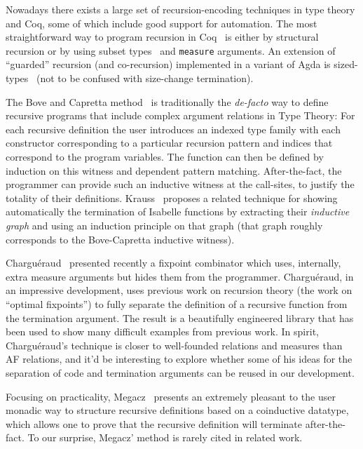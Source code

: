 \documentclass{llncs}
\begin{document}
Nowadays there exists a large set of recursion-encoding techniques in 
type theory and Coq, some of which include good support for automation.
The most straightforward way to program recursion in Coq~\cite{coqart} is either by 
structural recursion or by using subset types~\cite{Sozeau06subsetcoercions} 
and \lstinline|measure| arguments. An extension of ``guarded'' recursion (and co-recursion)
implemented in a variant of Agda is sized-types~\cite{abel:tlca03} (not to be confused with 
size-change termination).

The Bove and Capretta method~\cite{bove-capretta} is traditionally the {\em de-facto} way to define 
recursive programs that include complex argument relations in Type Theory: For each recursive
definition the user introduces an indexed type family with each constructor corresponding
to a particular recursion pattern and indices that correspond to the program variables. The 
function can then be defined by induction on this witness and dependent pattern matching. 
After-the-fact, the programmer can provide such an inductive witness at the call-sites, to 
justify the totality of their definitions. 
Krauss~\cite{krauss-function} proposes a related technique for showing automatically 
the termination of Isabelle functions by extracting their {\em inductive graph} 
and using an induction principle on that graph (that graph roughly corresponds
to the Bove-Capretta inductive witness).

Chargu\'eraud~\cite{chargueraud-10-fix} presented recently a fixpoint combinator which 
uses, internally, extra measure arguments but hides them from the programmer. 
Chargu\'eraud, in an impressive development, uses previous work on recursion theory 
(the work on ``optimal fixpoints'') to fully separate the definition of a recursive 
function from the termination argument. The result is a beautifully engineered library
that has been used to show many difficult examples from previous work. In spirit, Chargu\'eraud's 
technique is closer to well-founded relations and measures than AF relations, and it'd be 
interesting to explore whether some of his ideas for the separation of 
code and termination arguments can be reused in our development. 

Focusing on practicality, Megacz~\cite{Megacz:coinductive-monad} presents an extremely 
pleasant to the user monadic way to structure recursive definitions based on a coinductive 
datatype, which allows one to prove that the recursive definition will terminate 
after-the-fact. To our surprise, Megacz' method is rarely cited in related work.
\end{document}
